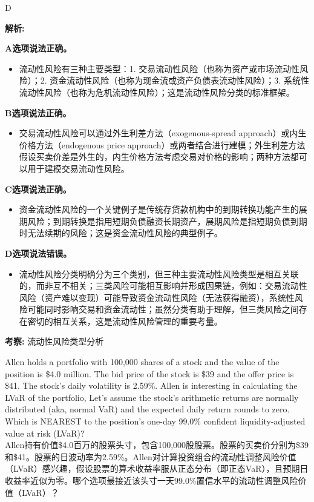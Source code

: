 \documentclass{article}
\newcounter{question} %
\newenvironment{explanation}
{\textbf{解析:}\par}
{\par}
\newcommand{\checklist}[1]{
    \textbf{考察:} #1 \par %
    \addcontentsline{toc}{subsection}{题号\thequestion 考察: #1} %
    \vspace{2em} %
}
\begin{document}
\begin{correctanswer}
    D
\end{correctanswer}

\begin{explanation}
    \textbf{A选项说法正确。}
    \begin{itemize}
        \item 流动性风险有三种主要类型：1. 交易流动性风险（也称为资产或市场流动性风险）；2. 资金流动性风险（也称为现金流或资产负债表流动性风险）；3. 系统性流动性风险（也称为危机流动性风险）；这是流动性风险分类的标准框架。
    \end{itemize}

    \textbf{B选项说法正确。}
    \begin{itemize}
        \item 交易流动性风险可以通过外生利差方法（exogenous-spread approach）或内生价格方法（endogenous price approach）或两者结合进行建模；外生利差方法假设买卖价差是外生的，内生价格方法考虑交易对价格的影响；两种方法都可以用于建模交易流动性风险。
    \end{itemize}

    \textbf{C选项说法正确。}
    \begin{itemize}
        \item 资金流动性风险的一个关键例子是传统存贷款机构中的到期转换功能产生的展期风险；到期转换是指用短期负债融资长期资产，展期风险是指短期负债到期时无法续期的风险；这是资金流动性风险的典型例子。
    \end{itemize}

    \textbf{D选项说法错误。}
    \begin{itemize}
        \item 流动性风险分类明确分为三个类别，但三种主要流动性风险类型是相互关联的，而非互不相关；三类风险可能相互影响并形成因果链，例如：交易流动性风险（资产难以变现）可能导致资金流动性风险（无法获得融资），系统性风险可能同时影响交易和资金流动性；虽然分类有助于理解，但三类风险之间存在密切的相互关系，这是流动性风险管理的重要考量。
    \end{itemize}
\end{explanation}

\checklist{流动性风险类型分析}


\begin{question}
    Allen holds a portfolio with 100,000 shares of a stock and the value of the position is \$4.0 million. The bid price of the stock is \$39 and the offer price is \$41. The stock's daily volatility is 2.59\%. Allen is interesting in calculating the LVaR of the portfolio, Let's assume the stock's arithmetic returns are normally distributed (aka, normal VaR) and the expected daily return rounds to zero. Which is NEAREST to the position's one-day 99.0\% confident liquidity-adjusted value at risk (LVaR)?\\
    Allen持有价值\$4.0百万的股票头寸，包含100,000股股票。股票的买卖价分别为\$39和\$41。股票的日波动率为2.59\%。Allen对计算投资组合的流动性调整风险价值（LVaR）感兴趣，假设股票的算术收益率服从正态分布（即正态VaR），且预期日收益率近似为零。哪个选项最接近该头寸一天99.0\%置信水平的流动性调整风险价值（LVaR）？
\end{question}
\end{document}
